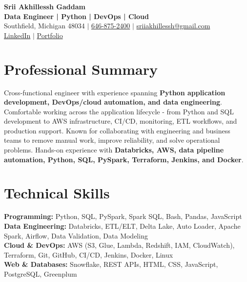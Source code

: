 \documentclass[letterpaper,10pt]{article}
\begin{document}
\fontsize{9.35pt}{10.45pt}\selectfont

\begin{center}
    {\LARGE \textbf{Srii Akhillessh Gaddam}} \\[-1pt]
    \textbf{Data Engineer | Python | DevOps | Cloud} \\[2pt]
    Southfield, Michigan 48034 $|$
    \href{tel:6468752400}{646-875-2400} $|$
    \href{mailto:sriiakhillessh@gmail.com}{sriiakhillessh@gmail.com} \\[1pt]
    \href{https://www.linkedin.com/in/srii-akhiilessh-gaddam-b48668191/}{LinkedIn} $|$
    \href{https://sriiakhillesshg.github.io/portfolio/}{Portfolio}
\end{center}
\vspace{-8pt}

\section{Professional Summary}
\small{Cross-functional engineer with experience spanning \textbf{Python application development, DevOps/cloud automation, and data engineering}. Comfortable working across the application lifecycle - from Python and SQL development to AWS infrastructure, CI/CD, monitoring, ETL workflows, and production support. Known for collaborating with engineering and business teams to remove manual work, improve reliability, and solve operational problems. Hands-on experience with \textbf{Databricks, AWS, data pipeline automation, Python, SQL, PySpark, Terraform, Jenkins, and Docker}.}

\section{Technical Skills}
\small{
\textbf{Programming:} Python, SQL, PySpark, Spark SQL, Bash, Pandas, JavaScript \\
\textbf{Data Engineering:} Databricks, ETL/ELT, Delta Lake, Auto Loader, Apache Spark, Airflow, Data Validation, Data Modeling \\
\textbf{Cloud \& DevOps:} AWS (S3, Glue, Lambda, Redshift, IAM, CloudWatch), Terraform, Git, GitHub, CI/CD, Jenkins, Docker, Linux \\
\textbf{Web \& Databases:} Snowflake, REST APIs, HTML, CSS, JavaScript, PostgreSQL, Greenplum
}

\end{document}
